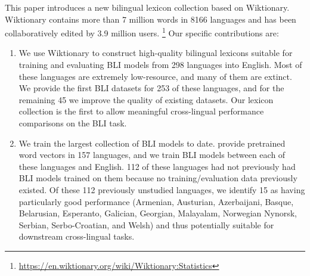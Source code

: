 \documentclass[11pt]{article}
\begin{document}
This paper introduces a new bilingual lexicon collection based on Wiktionary.
Wiktionary contains more than 7 million words in 8166 languages and has been collaboratively edited by 3.9 million users.%
\footnote{\url{https://en.wiktionary.org/wiki/Wiktionary:Statistics}}
Our specific contributions are:
\begin{enumerate}
    \item
        We use Wiktionary to construct high-quality bilingual lexicons suitable for training and evaluating BLI models from 298 languages into English.
        Most of these languages are extremely low-resource,
        and many of them are extinct. %
        We provide the first BLI datasets for 253 of these languages,
        and for the remaining 45 we improve the quality of existing datasets.
        Our lexicon collection is the first to allow meaningful cross-lingual performance comparisons on the BLI task.
    \item
        We train the largest collection of BLI models to date.
        \citet{grave2018learning} provide pretrained word vectors in 157 languages, and we train BLI models between each of these languages and English.
        112 of these languages had not previously had BLI models trained on them because no training/evaluation data previously existed.
        Of these 112 previously unstudied languages, we identify 15 as having particularly good performance
        (Armenian,
        Austurian,
        Azerbaijani,
        Basque,
        Belarusian,
        Esperanto,
        Galician,
        Georgian,
        Malayalam,
        Norwegian Nynorsk,
        Serbian,
        Serbo-Croatian,
        and Welsh)
        and thus potentially suitable for downstream cross-lingual tasks.
\end{enumerate}
\end{document}
